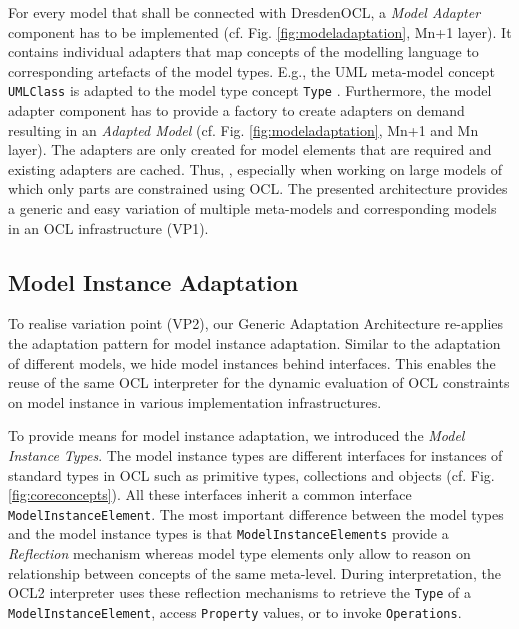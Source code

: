 	For every model that shall be connected with DresdenOCL, 
	a \emph{Model Adapter} component has to be implemented (cf. Fig. \ref{fig:modeladaptation}, Mn+1 layer). 
	It contains individual adapters that map concepts of the modelling
	language to corresponding artefacts of the model types. E.g., the UML
	meta-model concept \texttt{UMLClass} is adapted to the model type concept
	\texttt{Type} . 
	Furthermore, the model adapter component has to provide a factory to create 
	adapters on demand resulting in an \textit{Adapted Model} (cf. Fig.
	\ref{fig:modeladaptation}, Mn+1 and Mn layer).
	The adapters are only created for model elements that are required and
	existing adapters are cached. Thus, , 
	especially when working on large models of which only parts are constrained using OCL.
	The presented architecture provides a generic and easy variation of multiple meta-models
	and corresponding models in an OCL infrastructure (VP1).


\subsection{Model Instance Adaptation}
	
	To realise variation point (VP2), our Generic Adaptation Architecture
	re-applies the adaptation pattern for model instance adaptation.
	Similar to the adaptation of different models, we hide model
	instances behind
	interfaces. This enables the reuse of the same OCL interpreter for the dynamic
	evaluation of OCL constraints on model instance in various implementation
	infrastructures. 
	
	 To provide means for model instance adaptation, we introduced the
	\emph{Model Instance Types}.  The model instance types are different
	interfaces for instances of standard types in OCL such as primitive types, 
	collections and objects (cf. Fig. \ref{fig:coreconcepts}). 
	All these	interfaces inherit a common interface \texttt{ModelInstanceElement}. The most 
	important difference between the model types and the model instance types
	is that \texttt{ModelInstanceElements} provide a \emph{Reflection} \cite{maesOOPSLA87} mechanism whereas 
	model type elements only allow to reason on relationship between concepts of
	the same meta-level. During interpretation, the OCL2 interpreter uses these reflection mechanisms to
	retrieve the \texttt{Type} of a \texttt{ModelInstanceElement}, access \texttt{Property}
	values, or to invoke \texttt{Operations}.
	
